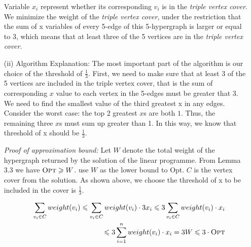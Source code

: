 \documentclass{article}
\renewcommand{\leq}{\leqslant}
\renewcommand{\geq}{\geqslant}
\newcounter{rcounter}
\newenvironment{rlist}%
{\begin{list}{\setnr-\arabic{rcounter}}{\usecounter{rcounter}}}{\end{list}}
\begin{document}
\begin{rlist}
\begin{enumerate}
            Variable $x_i$ represent whether its corresponding $v_i$ is in the \textit{triple vertex cover}. 
            We minimize the weight of the \textit{triple vertex cover}, under the restriction that the sum 
            of x variables of every 5-edge of this 5-hypergraph is larger or equal to 3, which means that 
            at least three of the 5 vertices are in the \textit{triple vertex cover}. 
            \item[(ii)]
            Algorithm Explanation: The most important part of the algorithm is our choice of the threshold of $\frac{1}{3}$. First, we need to make sure that at least 3 of the 5 vertices are included in the triple vertex cover, that is the sum of corresponding $x$ value to each vertex in the 5-edges must be greater that 3. We need to find the smallest value of the third greatest x in any edges. Consider the worst case: the top 2 greatest
            $x$s are both $1$. Thus, the remaining three $x$s must sum up greater than 1. In this way, we know that threshold of x should be $\frac{1}{3}$.
            
            \textit{Proof of approximation bound:} Let $W$ denote the total weight of the hypergraph returned by the solution of 
            the linear programme. From Lemma 3.3 we have $\textrm{\sc Opt} \geq W$. use $W$ as the lower bound to {\sc Opt}.
            $C$ is the vertex cover from the solution. As shown above, we choose the threshold of x to be included in 
            the cover is $\frac{1}{3}$.
            
            \begin{eqnarray*}
                &&\sum_{v_i\in C} weight(v_i) \leq \sum_{v_i\in C} weight(v_i) \cdot 3x_i 
                \leq 3 \sum_{v_i\in C} weight(v_i) \cdot x_i \\
                && \leq 3\sum_{i=1}^{n} weight(v_i) \cdot x_i = 3W \leq 3 \cdot \textrm{\sc Opt}
            \end{eqnarray*}
            

\end{enumerate}
\end{rlist}
\end{document}
